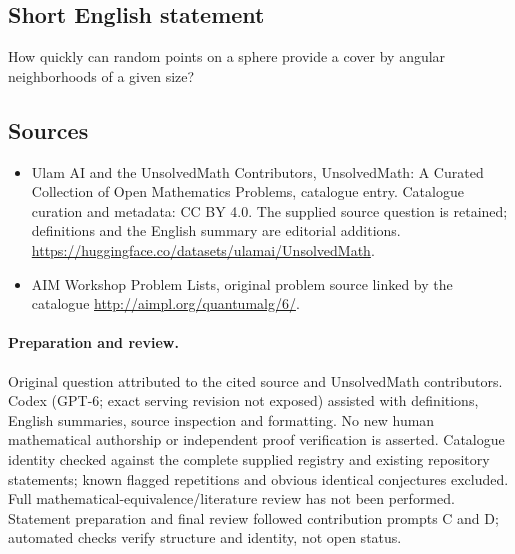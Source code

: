 \documentclass[11pt]{article}
\begin{document}
\subsection{Short English statement}
How quickly can random points on a sphere provide a cover by angular neighborhoods of a given size?
\subsection{Sources}
\begin{itemize}
\item[\hypertarget{source:statement:1}{S1}] Ulam AI and the UnsolvedMath Contributors, UnsolvedMath: A Curated Collection of Open Mathematics Problems, catalogue entry. Catalogue curation and metadata: CC BY 4.0. The supplied source question is retained; definitions and the English summary are editorial additions.
\url{https://huggingface.co/datasets/ulamai/UnsolvedMath}.
\item[\hypertarget{source:statement:2}{S2}] AIM Workshop Problem Lists, original problem source linked by the catalogue
\url{http://aimpl.org/quantumalg/6/}.
\end{itemize}
\paragraph{Preparation and review.}
Original question attributed to the cited source and UnsolvedMath contributors. Codex (GPT-6; exact serving revision not exposed) assisted with definitions, English summaries, source inspection and formatting. No new human mathematical authorship or independent proof verification is asserted. Catalogue identity checked against the complete supplied registry and existing repository statements; known flagged repetitions and obvious identical conjectures excluded. Full mathematical-equivalence/literature review has not been performed. Statement preparation and final review followed contribution prompts C and D; automated checks verify structure and identity, not open status.
\label{end:statement}
\end{document}
